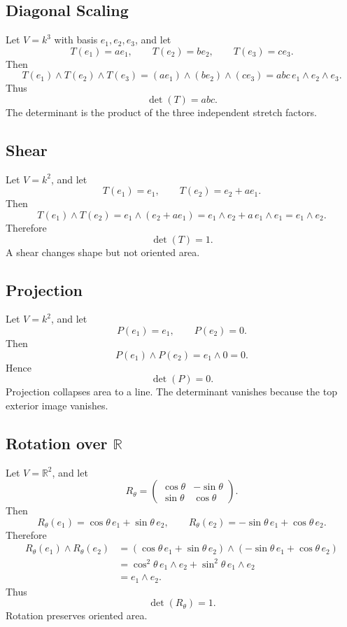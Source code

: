\documentclass[11pt]{memoir}
\newcommand{\bR}{\mathbb{R}}
\begin{document}
\subsection{Diagonal Scaling}

Let \(V=k^3\) with basis \(e_1,e_2,e_3\), and let
\[
  T(e_1)=a e_1,\qquad T(e_2)=b e_2,\qquad T(e_3)=c e_3.
\]
Then
\[
  T(e_1)\wedge T(e_2)\wedge T(e_3)
  =
  (a e_1)\wedge(b e_2)\wedge(c e_3)
  =
  abc\,e_1\wedge e_2\wedge e_3.
\]
Thus
\[
  \det(T)=abc.
\]
The determinant is the product of the three independent stretch
factors.

\subsection{Shear}

Let \(V=k^2\), and let
\[
  T(e_1)=e_1,\qquad T(e_2)=e_2+a e_1.
\]
Then
\[
  T(e_1)\wedge T(e_2)
  =
  e_1\wedge(e_2+a e_1)
  =
  e_1\wedge e_2+a\,e_1\wedge e_1
  =
  e_1\wedge e_2.
\]
Therefore
\[
  \det(T)=1.
\]
A shear changes shape but not oriented area.

\subsection{Projection}

Let \(V=k^2\), and let
\[
  P(e_1)=e_1,\qquad P(e_2)=0.
\]
Then
\[
  P(e_1)\wedge P(e_2)=e_1\wedge0=0.
\]
Hence
\[
  \det(P)=0.
\]
Projection collapses area to a line. The determinant vanishes because
the top exterior image vanishes.

\subsection{\texorpdfstring{Rotation over \(\bR\)}{Rotation over R}}

Let \(V=\bR^2\), and let
\[
  R_\theta=
  \begin{pmatrix}
    \cos\theta & -\sin\theta\\
    \sin\theta & \cos\theta
  \end{pmatrix}.
\]
Then
\[
  R_\theta(e_1)=\cos\theta\,e_1+\sin\theta\,e_2,
  \qquad
  R_\theta(e_2)=-\sin\theta\,e_1+\cos\theta\,e_2.
\]
Therefore
\begin{align*}
  R_\theta(e_1)\wedge R_\theta(e_2)
  &=
  (\cos\theta\,e_1+\sin\theta\,e_2)
  \wedge
  (-\sin\theta\,e_1+\cos\theta\,e_2)\\
  &=
  \cos^2\theta\,e_1\wedge e_2
  +
  \sin^2\theta\,e_1\wedge e_2\\
  &=
  e_1\wedge e_2.
\end{align*}
Thus
\[
  \det(R_\theta)=1.
\]
Rotation preserves oriented area.
\end{document}
